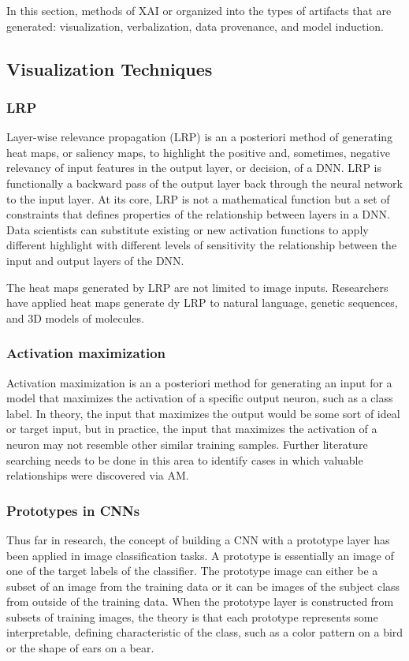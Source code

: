 \documentclass{IEEEtran}
\begin{document}
In this section, methods of XAI or organized into the types of artifacts that are generated: visualization, verbalization, data provenance, and model induction.

\subsection{Visualization Techniques}

\subsubsection{LRP}

Layer-wise relevance propagation (LRP) is an a posteriori method of generating heat maps, or saliency maps, to highlight the positive and, sometimes, negative relevancy of input features in the output layer, or decision, of a DNN.  LRP is functionally a backward pass of the output layer back through the neural network to the input layer.  At its core, LRP is not a mathematical function but a set of constraints that defines properties of the relationship between layers in a DNN.  Data scientists can substitute existing or new activation functions to apply different highlight with different levels of sensitivity the relationship between the input and output layers of the DNN.

The heat maps generated by LRP are not limited to image inputs.  Researchers have applied heat maps generate dy LRP to natural language, genetic sequences, and 3D models of molecules.

\subsubsection{Activation maximization}

Activation maximization is an a posteriori method for generating an input for a model that maximizes the activation of a specific output neuron\cite{Nguyen2016}, such as a class label.  In theory, the input that maximizes the output would be some sort of ideal or target input, but in practice, the input that maximizes the activation of a neuron may not resemble other similar training samples.  Further literature searching needs to be done in this area to identify cases in which valuable relationships were discovered via AM.

\subsubsection{Prototypes in CNNs} Thus far in research, the concept of building a CNN with a prototype layer has been applied in image classification tasks.  A prototype is essentially an image of one of the target labels of the classifier.  The prototype image can either be a subset of an image from the training data or it can be images of the subject class from outside of the training data.  When the prototype layer is constructed from subsets of training images, the theory is that each prototype represents some interpretable, defining characteristic of the class, such as a color pattern on a bird or the shape of ears on a bear.
\end{document}
